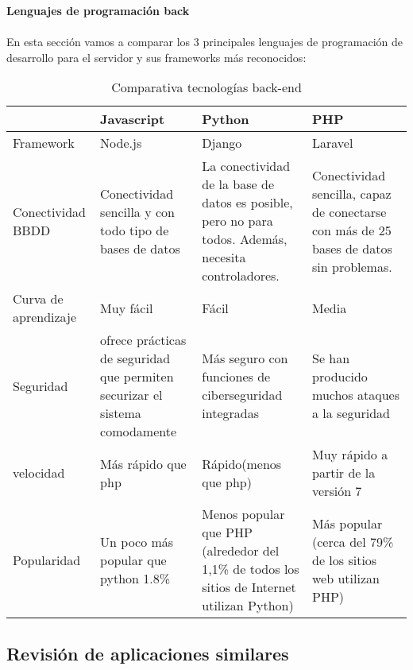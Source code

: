 \textbf{Lenguajes de programación back} \\ \\
En esta sección vamos a comparar los 3 principales lenguajes de programación de desarrollo para el servidor y sus frameworks más reconocidos: 
\begin{table}[H] %
    \centering
    \begin{tabular}{|p{2cm} |p{3cm} |p{3cm} |p{3cm} |} \hline 
         &  \textbf{Javascript}&  \textbf{Python}& \textbf{PHP}\\  \hline 
         Framework &  Node.js &  Django & Laravel\\ \hline
         
        Conectividad BBDD &  Conectividad sencilla y con todo tipo de bases de datos&  La conectividad de la base de datos es posible, pero no para todos. Además, necesita controladores. & Conectividad sencilla, capaz de conectarse con más de 25 bases de datos sin problemas.\\ \hline 
        Curva de aprendizaje &  Muy fácil & Fácil & Media\\ \hline 
        Seguridad &  ofrece prácticas de seguridad que permiten securizar el sistema comodamente &  Más seguro con funciones de ciberseguridad integradas & Se han producido muchos ataques a la seguridad	\\ \hline 
        velocidad &  Más rápido que php &  Rápido(menos que php) & Muy rápido a partir de la versión 7\\ \hline 
        Popularidad & Un poco más popular que python 1.8\% &  Menos popular que PHP (alrededor del 1,1\% de todos los sitios de Internet utilizan Python) & Más popular (cerca del 79\% de los sitios web utilizan PHP)\\ \hline 
    \end{tabular}
    \caption{Comparativa tecnologías back-end }
    \label{tab:tec_back}
\end{table}


\subsection{Revisión de aplicaciones similares}

